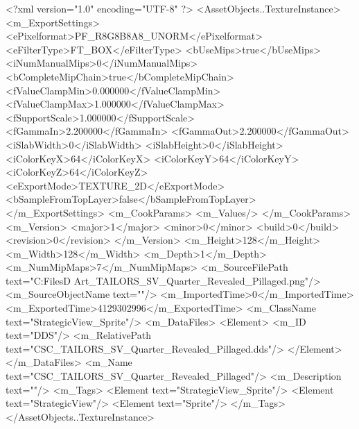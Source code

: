 <?xml version="1.0" encoding="UTF-8" ?>
<AssetObjects..TextureInstance>
	<m_ExportSettings>
		<ePixelformat>PF_R8G8B8A8_UNORM</ePixelformat>
		<eFilterType>FT_BOX</eFilterType>
		<bUseMips>true</bUseMips>
		<iNumManualMips>0</iNumManualMips>
		<bCompleteMipChain>true</bCompleteMipChain>
		<fValueClampMin>0.000000</fValueClampMin>
		<fValueClampMax>1.000000</fValueClampMax>
		<fSupportScale>1.000000</fSupportScale>
		<fGammaIn>2.200000</fGammaIn>
		<fGammaOut>2.200000</fGammaOut>
		<iSlabWidth>0</iSlabWidth>
		<iSlabHeight>0</iSlabHeight>
		<iColorKeyX>64</iColorKeyX>
		<iColorKeyY>64</iColorKeyY>
		<iColorKeyZ>64</iColorKeyZ>
		<eExportMode>TEXTURE_2D</eExportMode>
		<bSampleFromTopLayer>false</bSampleFromTopLayer>
	</m_ExportSettings>
	<m_CookParams>
		<m_Values/>
	</m_CookParams>
	<m_Version>
		<major>1</major>
		<minor>0</minor>
		<build>0</build>
		<revision>0</revision>
	</m_Version>
	<m_Height>128</m_Height>
	<m_Width>128</m_Width>
	<m_Depth>1</m_Depth>
	<m_NumMipMaps>7</m_NumMipMaps>
	<m_SourceFilePath text="C:\Users\Shadow\Desktop\Working Files\2D Art\Quarters\Tailors\StrategicView\CSC_TAILORS_SV_Quarter_Revealed_Pillaged.png"/>
	<m_SourceObjectName text=""/>
	<m_ImportedTime>0</m_ImportedTime>
	<m_ExportedTime>4129302996</m_ExportedTime>
	<m_ClassName text="StrategicView_Sprite"/>
	<m_DataFiles>
		<Element>
			<m_ID text="DDS"/>
			<m_RelativePath text="CSC_TAILORS_SV_Quarter_Revealed_Pillaged.dds"/>
		</Element>
	</m_DataFiles>
	<m_Name text="CSC_TAILORS_SV_Quarter_Revealed_Pillaged"/>
	<m_Description text=""/>
	<m_Tags>
		<Element text="StrategicView_Sprite"/>
		<Element text="StrategicView"/>
		<Element text="Sprite"/>
	</m_Tags>
</AssetObjects..TextureInstance>


